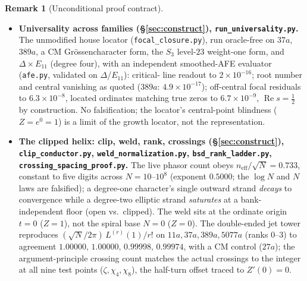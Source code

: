\documentclass[11pt]{article}
\theoremstyle{definition}
\newtheorem{remark}[theorem]{Remark}
\renewcommand{\Re}{\operatorname{Re}}
\begin{document}
\begin{remark}[Unconditional proof contract]
\begin{enumerate}
\begin{itemize}
\item \textbf{Universality across families (\S\ref{sec:construct}), \texttt{run\_universality.py}.}
The unmodified house locator (\texttt{focal\_closure.py}), run oracle-free on $37a$, $389a$, a CM
Gr\"ossencharacter form, the $S_3$ level-$23$ weight-one form, and $\Delta\times E_{11}$ (degree four),
with an independent smoothed-AFE evaluator (\texttt{afe.py}, validated on $\Delta$/$E_{11}$): critical-
line readout to $2\times10^{-16}$; root number and central vanishing as quoted
($389a$: $4.9\times10^{-17}$); off-central focal residuals to $6.3\times10^{-8}$, located ordinates
matching true zeros to $6.7\times10^{-9}$, $\Re s=\tfrac12$ by construction. No falsification; the
locator's central-point blindness ($Z=e^{0}=1$) is a limit of the growth locator, not the
representation.

\item \textbf{The clipped helix: clip, weld, rank, crossings (\S\ref{sec:construct}),
\texttt{clip\_conductor.py}, \texttt{weld\_normalization.py}, \texttt{bsd\_rank\_ladder.py},
\texttt{crossing\_spacing\_proof.py}.} The live phasor count obeys $n_{\mathrm{eff}}/\sqrt N=0.733$,
constant to five digits across $N=10$–$10^8$ (exponent $0.5000$; the $\log N$ and $N$ laws are
falsified); a degree-one character's single outward strand \emph{decays} to convergence while a
degree-two elliptic strand \emph{saturates} at a bank-independent floor (open vs.\ clipped). The weld
sits at the ordinate origin $t=0$ ($Z=1$), not the spiral base $N=0$ ($Z=0$). The double-ended jet
tower reproduces $(\sqrt N/2\pi)\,L^{(r)}(1)/r!$ on $11a,37a,389a,5077a$ (ranks $0$–$3$) to agreement
$1.00000,\,1.00000,\,0.99998,\,0.99974$, with a CM control ($27a$); the argument-principle crossing
count matches the actual crossings to the integer at all nine test points ($\zeta,\chi_4,\chi_8$), the
half-turn offset traced to $Z'(0)=0$.


\end{itemize}
\end{enumerate}
\end{remark}
\end{document}

